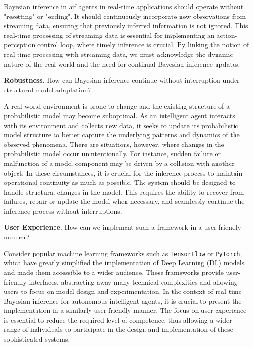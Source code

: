 Bayesian inference in \ac{aif} agents in real-time applications should operate without "resetting" or "ending".
It should continuously incorporate new observations from streaming data, ensuring that
previously inferred information is not ignored.
This real-time processing of streaming data is essential for implementing an action-perception
control loop, where timely inference is crucial.
By linking the notion of real-time processing with streaming data, we must acknowledge the
dynamic nature of the real world and the need for continual Bayesian inference updates.

\newcommand{\robustnessquestion}{
  How can Bayesian inference continue without interruption under structural model adaptation?
}

\begin{questions}[resume]
  \item \textbf{Robustness}. \robustnessquestion
  \label{question:robustness}
\end{questions}

A real-world environment is prone to change and the existing structure of a probabilistic model may become suboptimal. 
As an intelligent agent interacts with its environment and collects new data, it seeks to update its probabilistic model structure to better capture the underlying patterns and dynamics of the observed phenomena.
There are situations, however, where changes in the probabilistic model occur unintentionally.
For instance, sudden failure or malfunction of a model component may be driven by a collision with another object. 
In these circumstances, it is crucial for the inference process to maintain operational continuity as much as possible.
The system should be designed to handle structural changes in the model.
This requires the ability to recover from failures, repair or update the model when necessary, and seamlessly continue the inference process without interruptions.

\newcommand{\userexperiencequstion}{
  How can we implement such a framework in a user-friendly manner?
}

\begin{questions}[resume]
  \item \textbf{User Experience}. \userexperiencequstion
  \label{question:user-experience}
\end{questions}

Consider popular machine learning frameworks such as \texttt{TensorFlow} or \texttt{PyTorch},
which have greatly simplified the implementation of Deep Learning (DL) models and made
them accessible to a wider audience.
These frameworks provide user-friendly interfaces, abstracting away many technical
complexities and allowing users to focus on model design and experimentation.
In the context of real-time Bayesian inference for autonomous intelligent agents, it is
crucial to present the implementation in a similarly user-friendly manner.
The focus on user experience is essential to reduce the required level of competence, thus allowing
a wider range of individuals to participate in the design and implementation of these
sophisticated systems.

